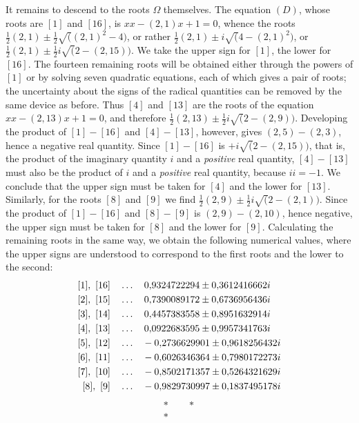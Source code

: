 It remains to descend to the roots \(\Omega\) themselves. The equation \((D)\), whose roots are \([1]\) and \([16]\), is \(xx-(2,1)x+1=0\), whence the roots \(\frac12(2,1)\pm\frac12\surd((2,1)^2-4)\), or rather \(\frac12(2,1)\pm i\surd(4-(2,1)^2)\), or \(\frac12(2,1)\pm\frac12i\surd(2-(2,15))\). We take the upper sign for \([1]\), the lower for \([16]\). The fourteen remaining roots will be obtained either through the powers of \([1]\) or by solving seven quadratic equations, each of which gives a pair of roots; the uncertainty about the signs of the radical quantities can be removed by the same device as before. Thus \([4]\) and \([13]\) are the roots of the equation \(xx-(2,13)x+1=0\), and therefore \(\frac12(2,13)\pm\frac12i\surd(2-(2,9))\). Developing the product of \([1]-[16]\) and \([4]-[13]\), however, gives \((2,5)-(2,3)\), hence a negative real quantity. Since \([1]-[16]\) is \(+i\surd(2-(2,15))\), that is, the product of the imaginary quantity \(i\) and a \textit{positive} real quantity, \([4]-[13]\) must also be the product of \(i\) and a \textit{positive} real quantity, because \(ii=-1\). We conclude that the upper sign must be taken for \([4]\) and the lower for \([13]\). Similarly, for the roots \([8]\) and \([9]\) we find \(\frac12(2,9)\pm\frac12i\surd(2-(2,1))\). Since the product of \([1]-[16]\) and \([8]-[9]\) is \((2,9)-(2,10)\), hence negative, the upper sign must be taken for \([8]\) and the lower for \([9]\). Calculating the remaining roots in the same way, we obtain the following numerical values, where the upper signs are understood to correspond to the first roots and the lower to the second:
\[\begin{aligned}\relax[1],\ [16]&\quad\ldots\quad 0{,}9324722294\pm 0{,}3612416662i\\\relax [2],\ [15]&\quad\ldots\quad 0{,}7390089172\pm 0{,}6736956436i\\\relax [3],\ [14]&\quad\ldots\quad 0{,}4457383558\pm 0{,}8951632914i\\\relax [4],\ [13]&\quad\ldots\quad 0{,}0922683595\pm 0{,}9957341763i\\\relax [5],\ [12]&\quad\ldots\quad -0{,}2736629901\pm 0{,}9618256432i\\\relax [6],\ [11]&\quad\ldots\quad -0{,}6026346364\pm 0{,}7980172273i\\\relax [7],\ [10]&\quad\ldots\quad -0{,}8502171357\pm 0{,}5264321629i\\\relax [8],\ [9]&\quad\ldots\quad -0{,}9829730997\pm 0{,}1837495178i\end{aligned}\] \[\begin{matrix}*\qquad *\\{}*\end{matrix}\]

